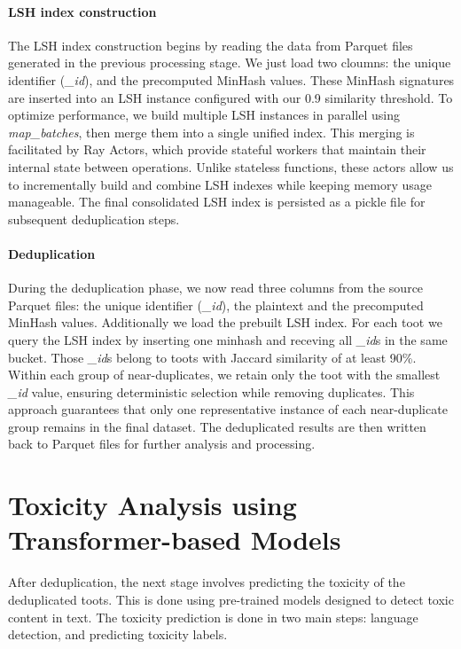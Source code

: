 \paragraph{LSH index construction}\label{step:lsh} The LSH index construction begins by reading the data from Parquet files generated in the previous processing stage. We just load two cloumns: the unique identifier (\textit{\_id}), and the precomputed MinHash values. These MinHash signatures are inserted into an LSH instance configured with our 0.9 similarity threshold. To optimize performance, we build multiple LSH instances in parallel using \textit{map\_batches}, then merge them into a single unified index. This merging is facilitated by Ray Actors, which provide stateful workers that maintain their internal state between operations. Unlike stateless functions, these actors allow us to incrementally build and combine LSH indexes while keeping memory usage manageable. The final consolidated LSH index is persisted as a pickle file for subsequent deduplication steps.

\paragraph{Deduplication}\label{step:dedup} During the deduplication phase, we now read three columns from the source Parquet files: the unique identifier (\textit{\_id}), the plaintext and the precomputed MinHash values. Additionally we load the prebuilt LSH index. For each toot we query the LSH index by inserting one minhash and receving all \textit{\_id}s in the same bucket. Those \textit{\_id}s belong to toots with Jaccard similarity of at least 90\%. Within each group of near-duplicates, we retain only the toot with the smallest \textit{\_id} value, ensuring deterministic selection while removing duplicates. This approach guarantees that only one representative instance of each near-duplicate group remains in the final dataset. The deduplicated results are then written back to Parquet files for further analysis and processing.

\section{Toxicity Analysis using Transformer-based Models}\label{step:toxicity}
After deduplication, the next stage involves predicting the toxicity of the deduplicated toots. This is done using pre-trained models designed to detect toxic content in text. The toxicity prediction is done in two main steps: language detection, and predicting toxicity labels.

